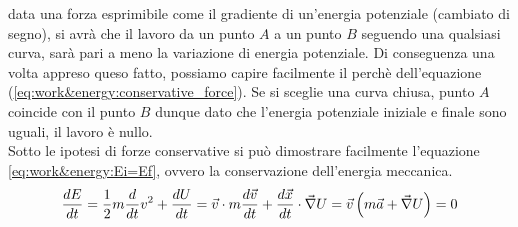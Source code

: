 data una forza esprimibile come il gradiente di un'energia potenziale
(cambiato di segno), si avrà che il lavoro da un punto $A$ a un punto $B$
seguendo una qualsiasi curva, sarà pari a meno la variazione di energia
potenziale. Di conseguenza una volta appreso queso fatto, possiamo capire
facilmente il perchè dell'equazione (\ref{eq:work&energy:conservative_force}).
Se si sceglie una curva chiusa, punto $A$ coincide con il punto $B$ dunque
dato che l'energia potenziale iniziale e finale sono uguali, il lavoro è
nullo.\\
Sotto le ipotesi di forze conservative si può dimostrare facilmente l'equazione
\ref{eq:work&energy:Ei=Ef}, ovvero la conservazione dell'energia meccanica.
\begin{equation}
    \frac{dE}{dt} = \frac12m\frac{d}{dt}v^2+\frac{dU}{dt} =
    \vec v\cdot m\frac{d\vec v}{dt} + \frac{d\vec x}{dt}\cdot\vec\nabla U =
    \vec v\left( m\vec a + \vec\nabla U\right) = 0
\label{eq:work&energy:energy_conservation}
\end{equation}